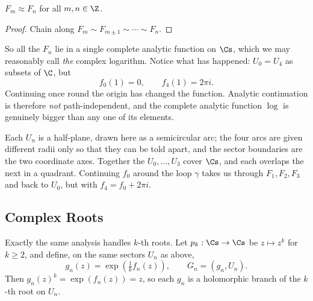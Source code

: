 \begin{corollary}\label{cor:logconnected}
	$F_m \approx F_n$ for all $m, n \in \Z$.
\end{corollary}

\begin{proof}
	Chain along $F_m \sim F_{m\pm 1} \sim \cdots \sim F_n$.
\end{proof}

So all the $F_n$ lie in a single complete analytic function on $\Cs$, which we may
reasonably call \emph{the} complex logarithm. Notice what has happened: $U_0 = U_4$ as
subsets of $\C$, but
$$
f_0(1) = 0, \qquad f_4(1) = 2\pi i.
$$
Continuing once round the origin has changed the function. Analytic continuation is
therefore \emph{not} path-independent, and the complete analytic function $\log$ is
genuinely bigger than any one of its elements.

\begin{center}
\end{center}

Each $U_n$ is a half-plane, drawn here as a semicircular arc; the four arcs are given
different radii only so that they can be told apart, and the sector boundaries are the
two coordinate axes. Together the $U_0, \dots, U_3$ cover $\Cs$, and each overlaps the
next in a quadrant. Continuing $f_0$ around the loop $\gamma$ takes us through
$F_1, F_2, F_3$ and back to $U_0$, but with $f_4 = f_0 + 2\pi i$.

\subsection{Complex Roots}

Exactly the same analysis handles $k$-th roots. Let $p_k : \Cs \to \Cs$ be $z \mapsto z^k$
for $k \geq 2$, and define, on the same sectors $U_n$ as above,
$$
g_n(z) = \exp\left(\tfrac{1}{k} f_n(z)\right), \qquad G_n = (g_n, U_n).
$$
Then $g_n(z)^k = \exp(f_n(z)) = z$, so each $g_n$ is a holomorphic branch of the $k$-th
root on $U_n$.


